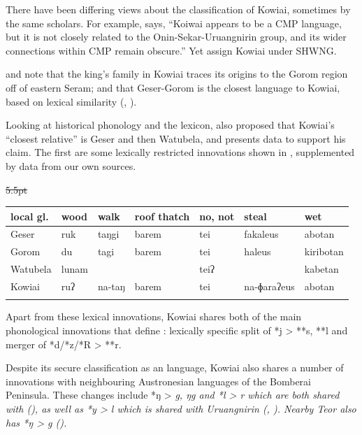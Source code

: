 There have been differing views about the classification of Kowiai,
sometimes by the same scholars.
For example, \citet[272]{Blust1993} says,
“Koiwai appears to be a CMP language,
but it is not closely related to the Onin-Sekar-Uruangnirin group,
and its wider connections within CMP remain obscure.” Yet \citet{BlustTrussel2020}
assign Kowiai under SHWNG.

\citet[80]{WalkerR1982} and \citet[22]{WalkerWalker1991} note
that the king’s family in Kowiai traces its origins to the Gorom
region off of eastern Seram;
and that Geser-Gorom is the closest language to Kowiai,
based on lexical similarity
(\citealp[84, 93]{WalkerR1982}, \citealp[120--122]{WalkerWalker1991}).

Looking at historical phonology
and the lexicon, \citet{Zobel2014} also proposed that Kowiai’s
“closest relative” is Geser
and then Watubela, and presents data to support his claim.
The first are some lexically restricted innovations shown in
, supplemented by data from our own sources.

\begin{table}
	\centering{}
	\st{5.5pt}\begin{tabular}{lllllll}\lsptoprule
local gl.	&	wood	&	walk	&	roof thatch	&	no, not	&	steal	&	wet\\	\midrule
Geser	&	ruk	&	taŋgi	&	barem	&	tei	&	fakaleus	&	abotan\\
Gorom	&	du	&	tagi	&	barem	&	tei	&	haleus	&	kiribotan\\
Watubela	&	lunam	&		&		&	teiʔ	&		&	kabetan\\
Kowiai	&	ruʔ	&	na-taŋ	&	barem	&	tei	&	na-ɸaraʔeus	&	abotan\\
		\lspbottomrule
	\end{tabular}
\end{table}

\newpage
Apart from these lexical innovations,
Kowiai shares both of the main phonological innovations that
define : lexically specific split of *j
> **s, **l and merger of *d/*z/*R > **r.

Despite its secure classification as an 
language, Kowiai also shares a number of innovations with neighbouring
Austronesian languages of the Bomberai Peninsula.
These changes include *ŋ > \it{g,
ŋg} and *l > \it{r} which are both shared with 
(), as well as *y > \it{l}
which is shared with Uruangnirin (, ).
Nearby Teor also has *ŋ > \it{g} ().

